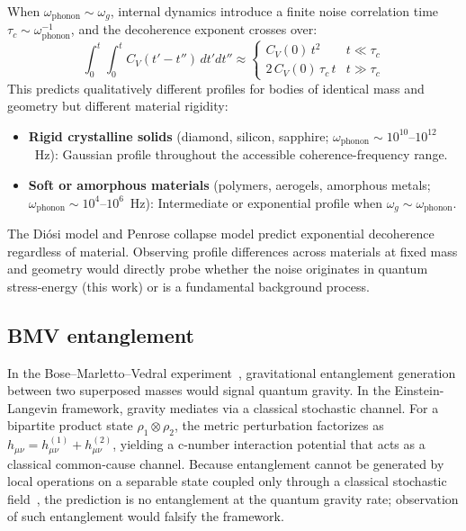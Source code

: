 \documentclass[12pt,a4paper]{article}
\begin{document}
When $\omega_{\text{phonon}} \sim \omega_g$, internal dynamics introduce a finite noise
correlation time $\tau_c \sim \omega_{\text{phonon}}^{-1}$, and the decoherence exponent
crosses over:
\begin{equation}
\int_0^t\!\!\int_0^t C_V(t'-t'')\,dt'dt'' \approx
\begin{cases}
C_V(0)\,t^2 & t \ll \tau_c \\
2\,C_V(0)\,\tau_c\,t & t \gg \tau_c
\end{cases}
\label{eq:crossover}
\end{equation}
This predicts qualitatively different profiles for bodies of identical mass and geometry
but different material rigidity:
\begin{itemize}
\item \textbf{Rigid crystalline solids} (diamond, silicon, sapphire;
$\omega_{\text{phonon}} \sim 10^{10}$--$10^{12}$~Hz): Gaussian profile throughout the
accessible coherence-frequency range.
\item \textbf{Soft or amorphous materials} (polymers, aerogels, amorphous metals;
$\omega_{\text{phonon}} \sim 10^4$--$10^6$~Hz): Intermediate or exponential profile when
$\omega_g \sim \omega_{\text{phonon}}$.
\end{itemize}
The Di\'osi model and Penrose collapse model predict exponential decoherence regardless of
material. Observing profile differences across materials at fixed mass and geometry would
directly probe whether the noise originates in quantum stress-energy (this work) or is a
fundamental background process.

\subsection{BMV entanglement}

In the Bose--Marletto--Vedral experiment~\cite{bose,marletto_vedral}, gravitational
entanglement generation between two superposed masses would signal quantum gravity. In the
Einstein-Langevin framework, gravity mediates via a classical stochastic channel. For a
bipartite product state $\rho_1\otimes\rho_2$, the metric perturbation factorizes as
$h_{\mu\nu} = h^{(1)}_{\mu\nu} + h^{(2)}_{\mu\nu}$, yielding a c-number interaction
potential that acts as a classical common-cause channel. Because entanglement cannot
be generated by local operations on a separable state coupled only through a classical
stochastic field~\cite{oppenheim,marletto_classical}, the prediction is no entanglement at the quantum
gravity rate; observation of such entanglement would falsify the framework.
\end{document}
